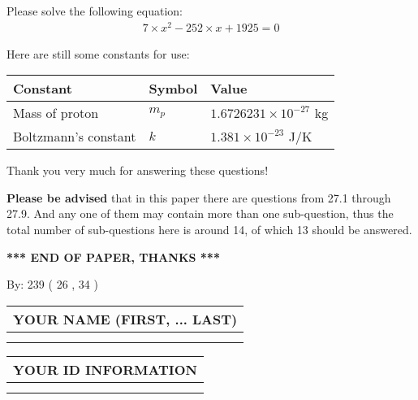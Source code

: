 \documentclass[12pt]{article}
\begin{document}
  
 
 

 
Please solve the following equation:
\begin{eqnarray*}
7 \times x^2  %
-252
                 \times x    %
+  %
1925 =0
\end{eqnarray*}
 

 

 
\vspace{0.3in}
   
   
 \vspace{0.2in}
Here are still some constants for use:
 
 
\noindent\begin{tabular}{|l|l|l|}
\hline
Constant & Symbol & Value \\
\hline
 
Mass of proton &
$m_p$ &
 $ 1.6726231 \times 10^{-27} $
kg \\
\hline
 
Boltzmann's constant &
$k$ &
 $ 1.381 \times 10^{-23} $
J/K \\
\hline
 
\end{tabular}
 
Thank you very much for answering these questions!
 
{\textbf{\large{Please be advised}}} that in this paper there are questions from
27.1 through
27.9.
And any one of them may contain more than one sub-question, thus the total number
of sub-questions here is around 14, of which
13 should be answered.
 
   
   
   
   
\vspace{1.0in} 
{\textbf{\large{ *** END OF PAPER, THANKS *** }}} 
   
   
\hspace{1.0in} By: 
         239 (          26 ,           34 )
   
   
   
   
\newpage 
\setcounter{page}{ 
    28001 } 
   
   
   
   
\noindent\begin{tabular}{|l|}
\hline
YOUR NAME (FIRST, ... LAST)  \\
\hline
 \\ 
 \\ 
\hline
\end{tabular}
\hspace{0.05in} \begin{tabular}{|l|}
\hline
 YOUR   ID   INFORMATION  \\
\hline
 \\ 
 \\ 
\hline
\end{tabular}
   
\end{document}
